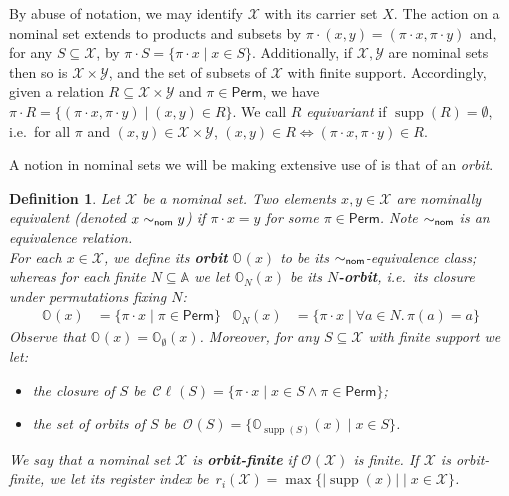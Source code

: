 \documentclass[10pt,a4paper]{article}
\newtheorem{definition}[theorem]{Definition}
\theoremstyle{definition}
\theoremstyle{remark}
\newcommand\boldemph[1]{\emph{\textbf{#1}}}
\newcommand\nt[1]{{\em\color{blue}#1}}
\newcommand\ntnote[1]{\sidenote{\nt{#1}}}
\newcommand\nomeq[0]{\sim_{\sf nom}}
\newcommand\regindex[0]{r_i}
\DeclareMathOperator{\supp}{supp}
\newcommand\Xcal{\mathcal{X}}
\newcommand\Ycal{\mathcal{Y}}
\newcommand\Atoms{\mathbb{A}}
\newcommand\orb[1][]{\mathcal{O}_{#1}}
\newcommand\orbs[1][]{\mathbb{O}_{#1}}
\newcommand\cls[1]{\mathcal{C}\!\ell_{#1}}
\renewcommand\S{N}
\newcommand\Perm[0]{{\mathsf{Perm}}}
\renewcommand\ntnote[1]{}
\begin{document}
By abuse of notation, we may identify $\Xcal$ with its carrier set $X$. 
The action on a nominal set extends to products and subsets by $\pi \cdot(x,y) = (\pi \cdot x, \pi \cdot y)$ and, for any $S \subseteq \Xcal$, by $\pi \cdot S = \{\pi \cdot x \mid x \in S\}$. 
Additionally, if $\Xcal, \Ycal$ are nominal sets then so is $\Xcal \times \Ycal$, and the set of subsets of $\Xcal$ with finite support.
Accordingly, given a relation $R\subseteq\Xcal\times\Ycal$ and $\pi\in\Perm$, we have $\pi\cdot R=\{(\pi\cdot x,\pi\cdot y)\mid (x,y)\in R\}$. We call $R$ \emph{equivariant} if $\supp(R)=\emptyset$, i.e.\ for all $\pi$ and $(x,y)\in\Xcal\times\Ycal$, $(x,y)\in R\iff (\pi\cdot x,\pi\cdot y)\in R$. 

A notion in nominal sets we will be making extensive use of is that of an \emph{orbit}.

\begin{definition}
    Let $\Xcal$ be a nominal set. 
    Two elements $x, y\in \Xcal$ are \emph{nominally equivalent} (denoted $x \nomeq y$) if $\pi \cdot x = y$ for some $\pi\in\Perm$. Note $\nomeq$ is an equivalence relation.
    \\
For each $x \in \Xcal$, we define its \boldemph{orbit} $\orbs(x)$ to be its $\nomeq$-equivalence class; whereas for each finite $\S\subseteq\Atoms$ we let $\orbs[\S](x)$ be its \boldemph{$\S$-orbit}, i.e.\ its closure under permutations fixing $\S$:
    \begin{align*}
        \orbs(x) &= \{\pi \cdot x \mid \pi \in \Perm\} &
    \orbs[\S](x) &= \{\pi \cdot x \mid \forall a\in\S.\,\pi(a)=a\}
    \end{align*}
    Observe that $\orbs(x)=\orbs[\emptyset](x)$.
    Moreover, for any $S\subseteq \Xcal$ with finite support we let:
    \begin{itemize}
    \item
the {\em closure} of $S$ be\
        $\cls{}(S) = \{\pi\cdot x\mid x\in S\land\pi\in\Perm\}$;
      \item the \emph{set of orbits} of $S$ be\
   $
        \orb(S) = \{ \orbs[\supp(S)](x) \mid x \in S\}
    $.
      \end{itemize}
We say that a nominal set $\Xcal$ is \boldemph{orbit-finite} if $\orb(\Xcal)$ is finite.
If $\Xcal$ is orbit-finite, we let its \emph{register index} be\
    $
        \regindex(\Xcal) = \max\{|\supp(x)| \mid x \in \Xcal\}
        $.\ntnote{can we find a standard term for this, e.g. from Pitts}
\end{definition}
\end{document}
